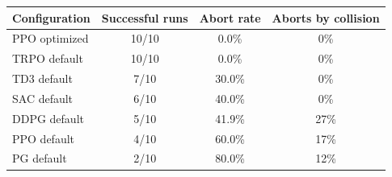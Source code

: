 \begin{tabular}{lccc}
\toprule
Configuration & Successful runs & Abort rate & Aborts by collision \\
\midrule
PPO optimized & 10/10 & 0.0\% & 0\% \\
TRPO default & 10/10 & 0.0\% & 0\% \\
TD3 default & 7/10 & 30.0\% & 0\% \\
SAC default & 6/10 & 40.0\% & 0\% \\
DDPG default & 5/10 & 41.9\% & 27\% \\
PPO default & 4/10 & 60.0\% & 17\% \\
PG default & 2/10 & 80.0\% & 12\% \\
\bottomrule
\end{tabular}
